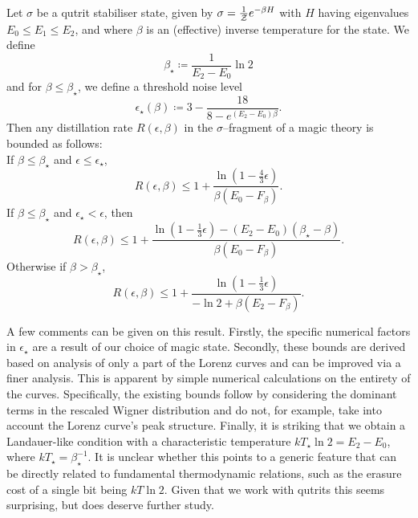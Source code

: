 \documentclass[pra,
aps,
twocolumn,
superscriptaddress,
groupedaddress,
nofootinbib,
reprint
]{revtex4-1}
\begin{document}
\begin{theorem}\label{thm:stab_bounds}
	Let $\sigma$ be a qutrit stabiliser state, given by $\sigma = \frac{1}{\mathcal{Z}} e^{-\beta H}$ with $H$ having eigenvalues $E_0 \le E_1 \le E_2$, and where $\beta$ is an (effective) inverse temperature for the state. 
We define
\begin{equation}
	\beta_\star \coloneqq \frac{1}{E_2 - E_0} \ln{2}
\end{equation}
and for $\beta \leq \beta_\star$, we define a threshold noise level
\begin{equation}
	\epsilon_{\star}(\beta) \coloneqq 3 - \dfrac{18}{8-e^{(E_2 - E_0)\beta}}.
\end{equation}
Then any distillation rate $R(\epsilon, \beta)$ in the $\sigma$--fragment of a magic theory is bounded as follows:\\
If $\beta \leq \beta_{\star}$ and $\epsilon  \leq \epsilon_{\star}$,
\begin{equation}
	R(\epsilon,\beta) \leq 1 + \frac{\ln{\left( 1 - \frac{4}{3}\epsilon \right)}}{\beta (E_0 - F_\beta)}.
\end{equation}
If $\beta \leq \beta_{\star}$ and $\epsilon_{\star} < \epsilon$, then
\begin{equation}
	R(\epsilon, \beta) \le 1 + \frac{\ln{\left(1-\frac{1}{3}\epsilon \right)} - (E_2 - E_0)(\beta_{\star} - \beta)}{\beta (E_0 - F_\beta)}.
\end{equation}
Otherwise if $\beta > \beta_{\star}$,
\begin{equation}
	R(\epsilon, \beta) \leq  1+ \frac{\ln{\left(1-\frac{1}{3}\epsilon \right)}}{-\ln{2} + \beta (E_2 - F_\beta)}.
\end{equation}
\end{theorem}
A few comments can be given on this result. 
Firstly, the specific numerical factors in $\epsilon_\star$ are a result of our choice of magic state. 
Secondly, these bounds are derived based on analysis of only a part of the Lorenz curves and can be improved via a finer analysis. 
This is apparent by simple numerical calculations on the entirety of the curves.
Specifically, the existing bounds follow by considering the dominant terms in the rescaled Wigner distribution and do not, for example, take into account the Lorenz curve's peak structure. 
Finally, it is striking that we obtain a Landauer-like condition with a characteristic temperature $kT_\star \ln 2 = E_2 - E_0$, where $kT_\star = \beta_\star^{-1}$. 
It is unclear whether this points to a generic feature that can be directly related to fundamental thermodynamic relations, such as the erasure cost of a single bit being $kT \ln 2$. 
Given that we work with qutrits this seems surprising, but does deserve further study.
\end{document}
